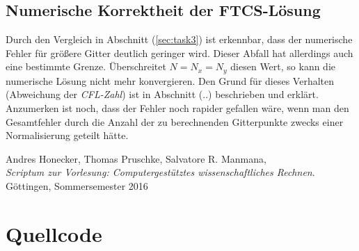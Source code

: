 \documentclass[12pt,a4paper,titlepage,headinclude,bibtotoc]{scrartcl}
\begin{document}
\subsection{Numerische Korrektheit der FTCS-Lösung}
\label{sec:disc_num_corr}
Durch den Vergleich in Abschnitt (\ref{sec:task3}) ist erkennbar, dass der numerische Fehler für größere Gitter deutlich geringer wird. Dieser Abfall hat allerdings auch eine bestimmte Grenze. Überschreitet $N = N_x = N_y$ diesen Wert, so kann die numerische Lösung nicht mehr konvergieren. Den Grund für dieses Verhalten (Abweichung der \textit{CFL-Zahl}) ist in Abschnitt (..) beschrieben und erklärt. Anzumerken ist noch, dass der Fehler noch rapider gefallen wäre, wenn man den Gesamtfehler durch die Anzahl der zu berechnenden Gitterpunkte zwecks einer Normalisierung geteilt hätte.

\begin{thebibliography}{9}
  Andres Honecker, Thomas Pruschke, Salvatore R. Manmana, \\
  \emph{Scriptum zur Vorlesung: Computergestütztes wissenschaftliches Rechnen}. \\
 Göttingen,
  Sommersemester 2016
 
 
 
 \end{thebibliography}

\appendix
\section{Quellcode}
\label{sec:source} 
%
\end{document}
